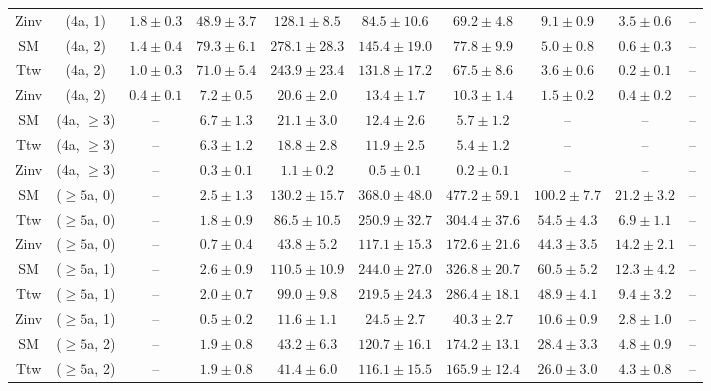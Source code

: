 \begin{table}[h!]
{\begin{tabular}{cccccccccc}
	Zinv & (4a, 1) & $1.8\pm 0.3$ & $48.9\pm 3.7$ & $128.1\pm 8.5$ & $84.5\pm 10.6$ & $69.2\pm 4.8$ & $9.1\pm 0.9$ & $3.5\pm 0.6$ & -- \\[0.5ex] 
	SM & (4a, 2) & $1.4\pm 0.4$ & $79.3\pm 6.1$ & $278.1\pm 28.3$ & $145.4\pm 19.0$ & $77.8\pm 9.9$ & $5.0\pm 0.8$ & $0.6\pm 0.3$ & -- \\[0.5ex] 
	Ttw & (4a, 2) & $1.0\pm 0.3$ & $71.0\pm 5.4$ & $243.9\pm 23.4$ & $131.8\pm 17.2$ & $67.5\pm 8.6$ & $3.6\pm 0.6$ & $0.2\pm 0.1$ & -- \\[0.5ex] 
	Zinv & (4a, 2) & $0.4\pm 0.1$ & $7.2\pm 0.5$ & $20.6\pm 2.0$ & $13.4\pm 1.7$ & $10.3\pm 1.4$ & $1.5\pm 0.2$ & $0.4\pm 0.2$ & -- \\[0.5ex] 
	SM & (4a, $\ge3$) & -- & $6.7\pm 1.3$ & $21.1\pm 3.0$ & $12.4\pm 2.6$ & $5.7\pm 1.2$ & -- & -- & -- \\[0.5ex] 
	Ttw & (4a, $\ge3$) & -- & $6.3\pm 1.2$ & $18.8\pm 2.8$ & $11.9\pm 2.5$ & $5.4\pm 1.2$ & -- & -- & -- \\[0.5ex] 
	Zinv & (4a, $\ge3$) & -- & $0.3\pm 0.1$ & $1.1\pm 0.2$ & $0.5\pm 0.1$ & $0.2\pm 0.1$ & -- & -- & -- \\[0.5ex] 
	SM & ($\ge5$a, 0) & -- & $2.5\pm 1.3$ & $130.2\pm 15.7$ & $368.0\pm 48.0$ & $477.2\pm 59.1$ & $100.2\pm 7.7$ & $21.2\pm 3.2$ & -- \\[0.5ex] 
	Ttw & ($\ge5$a, 0) & -- & $1.8\pm 0.9$ & $86.5\pm 10.5$ & $250.9\pm 32.7$ & $304.4\pm 37.6$ & $54.5\pm 4.3$ & $6.9\pm 1.1$ & -- \\[0.5ex] 
	Zinv & ($\ge5$a, 0) & -- & $0.7\pm 0.4$ & $43.8\pm 5.2$ & $117.1\pm 15.3$ & $172.6\pm 21.6$ & $44.3\pm 3.5$ & $14.2\pm 2.1$ & -- \\[0.5ex] 
	SM & ($\ge5$a, 1) & -- & $2.6\pm 0.9$ & $110.5\pm 10.9$ & $244.0\pm 27.0$ & $326.8\pm 20.7$ & $60.5\pm 5.2$ & $12.3\pm 4.2$ & -- \\[0.5ex] 
	Ttw & ($\ge5$a, 1) & -- & $2.0\pm 0.7$ & $99.0\pm 9.8$ & $219.5\pm 24.3$ & $286.4\pm 18.1$ & $48.9\pm 4.1$ & $9.4\pm 3.2$ & -- \\[0.5ex] 
	Zinv & ($\ge5$a, 1) & -- & $0.5\pm 0.2$ & $11.6\pm 1.1$ & $24.5\pm 2.7$ & $40.3\pm 2.7$ & $10.6\pm 0.9$ & $2.8\pm 1.0$ & -- \\[0.5ex] 
	SM & ($\ge5$a, 2) & -- & $1.9\pm 0.8$ & $43.2\pm 6.3$ & $120.7\pm 16.1$ & $174.2\pm 13.1$ & $28.4\pm 3.3$ & $4.8\pm 0.9$ & -- \\[0.5ex] 
	Ttw & ($\ge5$a, 2) & -- & $1.9\pm 0.8$ & $41.4\pm 6.0$ & $116.1\pm 15.5$ & $165.9\pm 12.4$ & $26.0\pm 3.0$ & $4.3\pm 0.8$ & -- \\[0.5ex] 

\end{tabular}}
\end{table}

